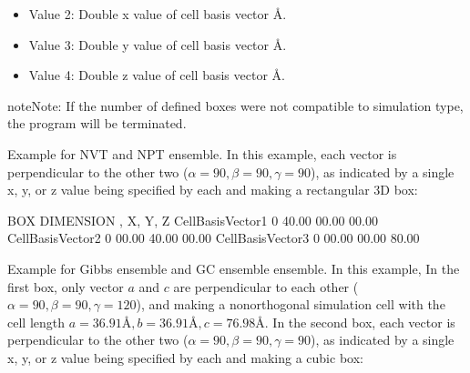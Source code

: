 \documentclass[letterpaper,10pt,english]{sphinxmanual}
\begin{document}
\begin{description}
\begin{itemize}
\item {} 
\sphinxAtStartPar
Value 2: Double \sphinxhyphen{} x value of cell basis vector \(Å\).

\item {} 
\sphinxAtStartPar
Value 3: Double \sphinxhyphen{} y value of cell basis vector \(Å\).

\item {} 
\sphinxAtStartPar
Value 4: Double \sphinxhyphen{} z value of cell basis vector \(Å\).

\end{itemize}

\begin{sphinxadmonition}{note}{Note:}
\sphinxAtStartPar
If the number of defined boxes were not compatible to simulation type, the program will be terminated.
\end{sphinxadmonition}

\sphinxAtStartPar
Example for NVT and NPT ensemble. In this example, each vector is perpendicular to the other two (\(\alpha = 90, \beta = 90, \gamma = 90\)), as indicated by a single x, y, or z value being specified by each and making a rectangular 3\sphinxhyphen{}D box:

\begin{sphinxVerbatim}[commandchars=\\\{\}]
\PYGZsh{}\PYGZsh{}\PYGZsh{}\PYGZsh{}\PYGZsh{}\PYGZsh{}\PYGZsh{}\PYGZsh{}\PYGZsh{}\PYGZsh{}\PYGZsh{}\PYGZsh{}\PYGZsh{}\PYGZsh{}\PYGZsh{}\PYGZsh{}\PYGZsh{}\PYGZsh{}\PYGZsh{}\PYGZsh{}\PYGZsh{}\PYGZsh{}\PYGZsh{}\PYGZsh{}\PYGZsh{}\PYGZsh{}\PYGZsh{}\PYGZsh{}\PYGZsh{}\PYGZsh{}\PYGZsh{}\PYGZsh{}\PYGZsh{}\PYGZsh{}\PYGZsh{}\PYGZsh{}\PYGZsh{}\PYGZsh{}\PYGZsh{}\PYGZsh{}\PYGZsh{}\PYGZsh{}\PYGZsh{}\PYGZsh{}
\PYGZsh{} BOX DIMENSION \PYGZsh{}, X, Y, Z
\PYGZsh{}\PYGZsh{}\PYGZsh{}\PYGZsh{}\PYGZsh{}\PYGZsh{}\PYGZsh{}\PYGZsh{}\PYGZsh{}\PYGZsh{}\PYGZsh{}\PYGZsh{}\PYGZsh{}\PYGZsh{}\PYGZsh{}\PYGZsh{}\PYGZsh{}\PYGZsh{}\PYGZsh{}\PYGZsh{}\PYGZsh{}\PYGZsh{}\PYGZsh{}\PYGZsh{}\PYGZsh{}\PYGZsh{}\PYGZsh{}\PYGZsh{}\PYGZsh{}\PYGZsh{}\PYGZsh{}\PYGZsh{}\PYGZsh{}\PYGZsh{}\PYGZsh{}\PYGZsh{}\PYGZsh{}\PYGZsh{}\PYGZsh{}\PYGZsh{}\PYGZsh{}\PYGZsh{}\PYGZsh{}\PYGZsh{}
CellBasisVector1  0   40.00   00.00   00.00
CellBasisVector2  0   00.00   40.00   00.00
CellBasisVector3  0   00.00   00.00   80.00
\end{sphinxVerbatim}

\sphinxAtStartPar
Example for Gibbs ensemble and GC ensemble ensemble. In this example, In the first box, only vector \(a\) and \(c\) are perpendicular to each other (\(\alpha = 90, \beta = 90, \gamma = 120\)), and making a non\sphinxhyphen{}orthogonal simulation cell with the cell length \(a = 36.91 Å, b = 36.91 Å, c = 76.98 Å\). In the second box, each vector is perpendicular to the other two (\(\alpha = 90, \beta = 90, \gamma = 90\)), as indicated by a single x, y, or z value being specified by each and making a cubic box:


\end{description}
\end{document}
